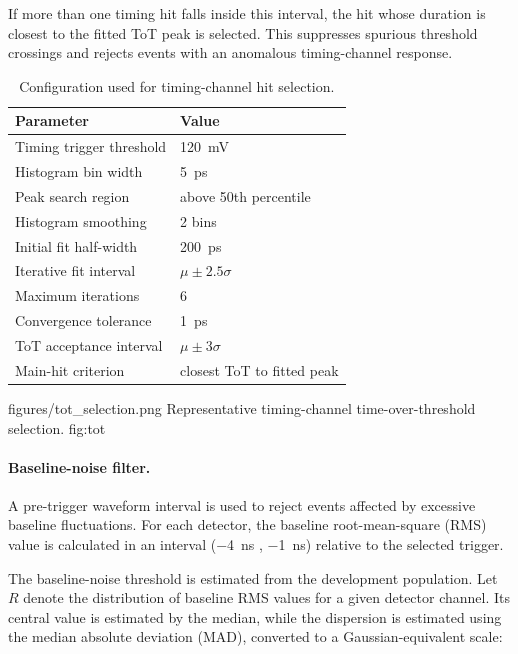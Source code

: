 If more than one timing hit falls inside this interval, the hit whose duration is closest to the fitted ToT peak is selected. This suppresses spurious threshold crossings and rejects events with an anomalous timing-channel response.

\begin{table}[H]
\centering
\caption{Configuration used for timing-channel hit selection.}
\label{tab:tot-config}
\small
\begin{tabular}{ll}
\toprule
Parameter & Value \\
\midrule
Timing trigger threshold & \SI{120}{mV} \\
Histogram bin width & \SI{5}{ps} \\
Peak search region & above 50th percentile \\
Histogram smoothing & 2 bins \\
Initial fit half-width & \SI{200}{ps} \\
Iterative fit interval & $\mu \pm 2.5\sigma$ \\
Maximum iterations & 6 \\
Convergence tolerance & \SI{1}{ps} \\
ToT acceptance interval & $\mu \pm 3\sigma$ \\
Main-hit criterion & closest ToT to fitted peak \\
\bottomrule
\end{tabular}
\end{table}


\reportfigure
    {figures/tot_selection.png}
    {Representative timing-channel time-over-threshold selection.}
    {fig:tot}


\paragraph{Baseline-noise filter.}

A pre-trigger waveform interval is used to reject events affected by excessive baseline fluctuations. 
For each detector, the baseline root-mean-square (RMS) value is calculated in an interval (\SI{-4}{ns} , \SI{-1}{ns}) relative to the selected trigger.

The baseline-noise threshold is estimated from the development population. Let \(R\) denote the distribution of baseline RMS values for a given detector channel. Its central value is estimated by the median, while the dispersion is estimated using the median absolute deviation (MAD), converted to a Gaussian-equivalent scale:

